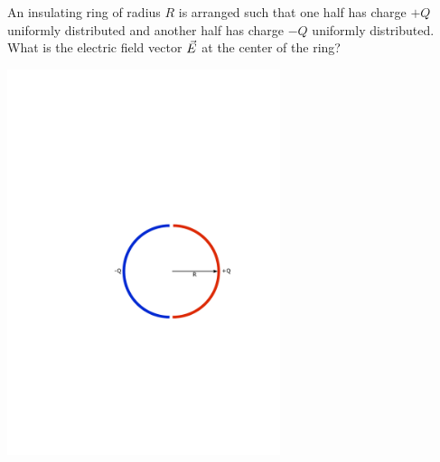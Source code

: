 \question An insulating ring of radius $R$ is arranged such that one half has charge $+Q$ uniformly distributed and another half has charge $-Q$ uniformly distributed. What is the electric field vector $\vec{E}$ at the center of the ring?

\begin{center}
	\includegraphics[width=8cm]{prob5.pdf}
\end{center}